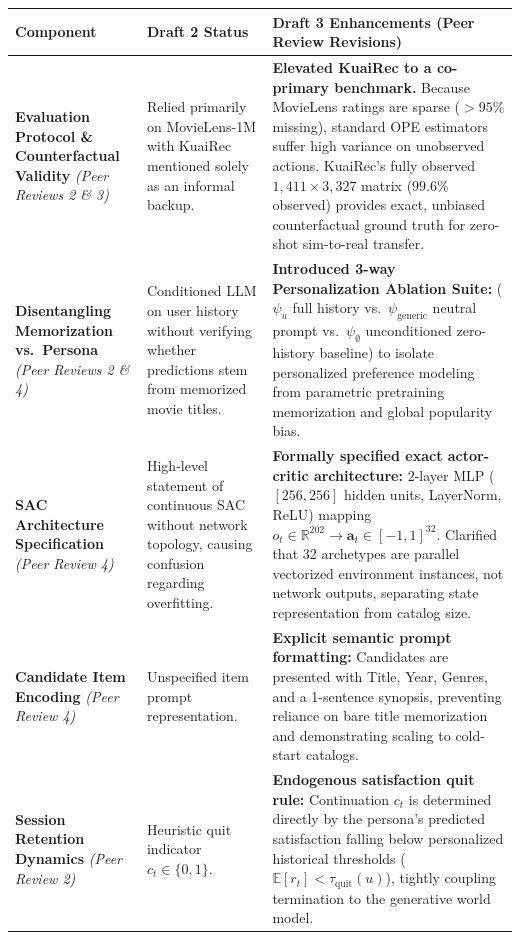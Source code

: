 \documentclass{article}
\begin{document}
\begin{table}[h]
\centering
\label{tab:diff}
\small
\begin{tabular}{@{}>{\raggedright\arraybackslash}p{2.5cm}>{\raggedright\arraybackslash}p{3.8cm}>{\raggedright\arraybackslash}p{6.4cm}@{}}
\toprule
\textbf{Component} & \textbf{Draft 2 Status} & \textbf{Draft 3 Enhancements (Peer Review Revisions)} \\ \midrule
\textbf{Evaluation Protocol \& Counterfactual Validity} \newline \textit{(Peer Reviews 2 \& 3)} & Relied primarily on MovieLens-1M with KuaiRec mentioned solely as an informal backup. & \textbf{Elevated KuaiRec to a co-primary benchmark.} Because MovieLens ratings are sparse ($>95\%$ missing), standard OPE estimators suffer high variance on unobserved actions. KuaiRec's fully observed $1,411 \times 3,327$ matrix ($99.6\%$ observed) provides exact, unbiased counterfactual ground truth for zero-shot sim-to-real transfer. \\ \addlinespace[4pt]
\textbf{Disentangling Memorization vs.\ Persona} \newline \textit{(Peer Reviews 2 \& 4)} & Conditioned LLM on user history without verifying whether predictions stem from memorized movie titles. & \textbf{Introduced 3-way Personalization Ablation Suite:} ($\psi_u$ full history vs.\ $\psi_{\text{generic}}$ neutral prompt vs.\ $\psi_{\emptyset}$ unconditioned zero-history baseline) to isolate personalized preference modeling from parametric pretraining memorization and global popularity bias. \\ \addlinespace[4pt]
\textbf{SAC Architecture Specification} \newline \textit{(Peer Review 4)} & High-level statement of continuous SAC without network topology, causing confusion regarding overfitting. & \textbf{Formally specified exact actor-critic architecture:} 2-layer MLP ($[256, 256]$ hidden units, LayerNorm, ReLU) mapping $o_t \in \mathbb{R}^{202} \to \bm{a}_t \in [-1, 1]^{32}$. Clarified that 32 archetypes are parallel vectorized environment instances, not network outputs, separating state representation from catalog size. \\ \addlinespace[4pt]
\textbf{Candidate Item Encoding} \newline \textit{(Peer Review 4)} & Unspecified item prompt representation. & \textbf{Explicit semantic prompt formatting:} Candidates are presented with Title, Year, Genres, and a 1-sentence synopsis, preventing reliance on bare title memorization and demonstrating scaling to cold-start catalogs. \\ \addlinespace[4pt]
\textbf{Session Retention Dynamics} \newline \textit{(Peer Review 2)} & Heuristic quit indicator $c_t \in \{0, 1\}$. & \textbf{Endogenous satisfaction quit rule:} Continuation $c_t$ is determined directly by the persona's predicted satisfaction falling below personalized historical thresholds ($\mathbb{E}[r_t] < \tau_{\text{quit}}(u)$), tightly coupling termination to the generative world model. \\ \bottomrule
\end{tabular}
\end{table}
\end{document}
